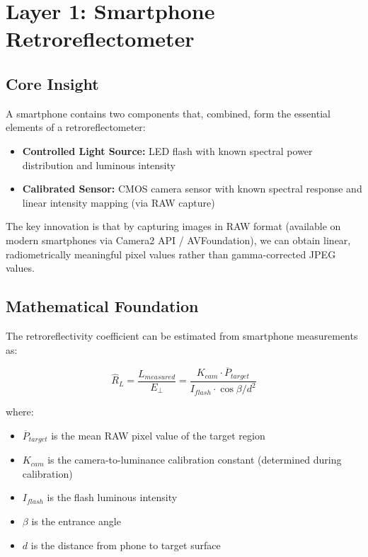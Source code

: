 \documentclass[11pt,a4paper]{article}
\begin{document}
\section{Layer 1: Smartphone Retroreflectometer}
\label{sec:layer1}

\subsection{Core Insight}

A smartphone contains two components that, combined, form the essential elements of a retroreflectometer:

\begin{itemize}[noitemsep]
    \item \textbf{Controlled Light Source:} LED flash with known spectral power distribution and luminous intensity
    \item \textbf{Calibrated Sensor:} CMOS camera sensor with known spectral response and linear intensity mapping (via RAW capture)
\end{itemize}

The key innovation is that by capturing images in RAW format (available on modern smartphones via Camera2 API / AVFoundation), we can obtain linear, radiometrically meaningful pixel values rather than gamma-corrected JPEG values.

\subsection{Mathematical Foundation}

The retroreflectivity coefficient can be estimated from smartphone measurements as:

\begin{equation}
\hat{R}_L = \frac{L_{measured}}{E_{\perp}} = \frac{K_{cam} \cdot \overline{P}_{target}}{I_{flash} \cdot \cos\beta / d^2}
\label{eq:smartphone_rl}
\end{equation}

where:
\begin{itemize}[noitemsep]
    \item $\overline{P}_{target}$ is the mean RAW pixel value of the target region
    \item $K_{cam}$ is the camera-to-luminance calibration constant (determined during calibration)
    \item $I_{flash}$ is the flash luminous intensity
    \item $\beta$ is the entrance angle
    \item $d$ is the distance from phone to target surface
\end{itemize}
\end{document}
